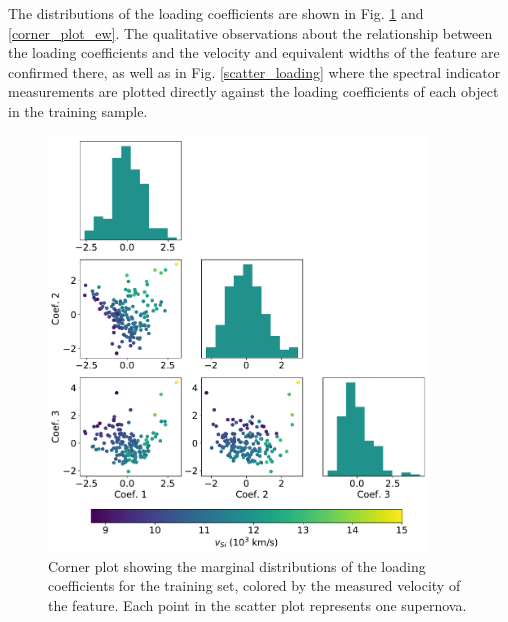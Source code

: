 The distributions of the loading coefficients are shown in Fig. \ref{corner_plot_vel} and \ref{corner_plot_ew}. The qualitative observations about the relationship between the loading coefficients and the velocity and equivalent widths of the feature are confirmed there, as well as in Fig. \ref{scatter_loading} where the spectral indicator measurements are plotted directly against the loading coefficients of each object in the training sample.

\begin{figure}[!htb]
    \centering
    \includegraphics[width=0.9\textwidth]{figures/si_feat_pca/corner_plot_vel.pdf}
    \caption{Corner plot showing the marginal distributions of the loading coefficients for the training set, colored by the measured velocity of the \siliconii\; feature. Each point in the scatter plot represents one supernova.}
    \label{corner_plot_vel}
\end{figure}

